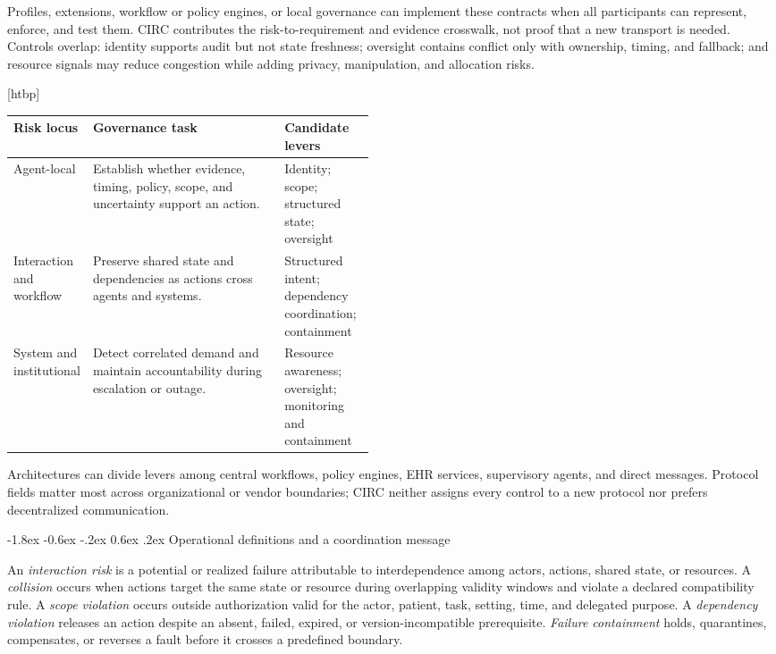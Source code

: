 \documentclass[10pt]{article}
\makeatletter
\renewcommand\subsection{\@startsection{subsection}{2}{\z@}%
  {-1.8ex \@plus -0.6ex \@minus -.2ex}%
  {0.6ex \@plus .2ex}%
  {\normalfont\sffamily\bfseries\normalsize}}
\renewenvironment{figure}[1][tbp]{\@dblfloat{figure}[#1]}{\end@dblfloat}
\makeatother
\begin{document}
Profiles, extensions, workflow or policy engines, or local governance can implement these contracts
when all participants can represent, enforce, and test them. CIRC contributes the risk-to-requirement
and evidence crosswalk, not proof that a new transport is needed. Controls overlap: identity supports
audit but not state freshness; oversight contains conflict only with ownership, timing, and fallback;
and resource signals may reduce congestion while adding privacy, manipulation, and allocation risks.

\begin{figure}[htbp]
\centering
\small
\setlength{\tabcolsep}{5pt}
\begin{tabularx}{0.97\linewidth}{C{0.22\linewidth}YB{0.25\linewidth}}
\toprule
Risk locus & Governance task & Candidate levers \\
\midrule
Agent-local & Establish whether evidence, timing, policy, scope, and uncertainty support an action. &
Identity; scope; structured state; oversight \\
Interaction and workflow & Preserve shared state and dependencies as actions cross agents and
systems. & Structured intent; dependency coordination; containment \\
System and institutional & Detect correlated demand and maintain accountability during escalation
or outage. & Resource awareness; oversight; monitoring and containment \\
\bottomrule
\end{tabularx}
\caption{CIRC connects risk loci to governance tasks and candidate controls. Arrows are intentionally
not one-to-one: controls overlap, and the appropriate implementation depends on the deployment.}
\label{fig:risk-control-map}
\end{figure}

Architectures can divide levers among central workflows, policy engines, EHR services, supervisory
agents, and direct messages. Protocol fields matter most across organizational or vendor boundaries;
CIRC neither assigns every control to a new protocol nor prefers decentralized communication.

\subsection{Operational definitions and a coordination message}

An \emph{interaction risk} is a potential or realized failure attributable to interdependence among
actors, actions, shared state, or resources. A \emph{collision} occurs when actions target the same
state or resource during overlapping validity windows and violate a declared compatibility rule. A
\emph{scope violation} occurs outside authorization valid for the actor, patient, task, setting, time,
and delegated purpose. A \emph{dependency violation} releases an action despite an absent, failed,
expired, or version-incompatible prerequisite. \emph{Failure containment} holds, quarantines,
compensates, or reverses a fault before it crosses a predefined boundary.
\end{document}
